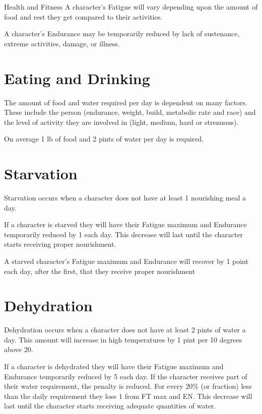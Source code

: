 \begin{Chapter}{Health and Fitness}
\label{health}
A character’s Fatigue will vary depending upon the amount of food and
rest they get compared to their activities.

A character’s Endurance may be temporarily reduced by lack of
sustenance, extreme activities, damage, or illness.

\section{Eating and Drinking}

The amount of food and water required per day is dependent on many
factors.  These include the person (endurance, weight, build,
metabolic rate and race) and the level of activity they are involved
in (light, medium, hard or strenuous).

On average 1 lb of food and 2 pints of water per day is required.


\section{Starvation}

Starvation occurs when a character does not have at least 1 nourishing
meal a day.

If a character is starved they will have their Fatigue maximum and
Endurance temporarily reduced by 1 each day. This decrease will last
until the character starts receiving proper nourishment.

A starved character’s Fatigue maximum and Endurance will recover by
1 point each day, after the first, that they receive proper
nourishment


\section{Dehydration}

Dehydration occurs when a character does not have at least 2 pints of
water a day.  This amount will increase in high temperatures by 1 pint
per 10 degrees above 20.

If a character is dehydrated they will have their Fatigue maximum and
Endurance temporarily reduced by 5 each day.  If the character
receives part of their water requirement, the penalty is reduced.
For every 20\% (or fraction) less than the daily requirement they lose
1 from FT max and EN. This decrease will last until the character
starts receiving adequate quantities of water.


\end{Chapter}
